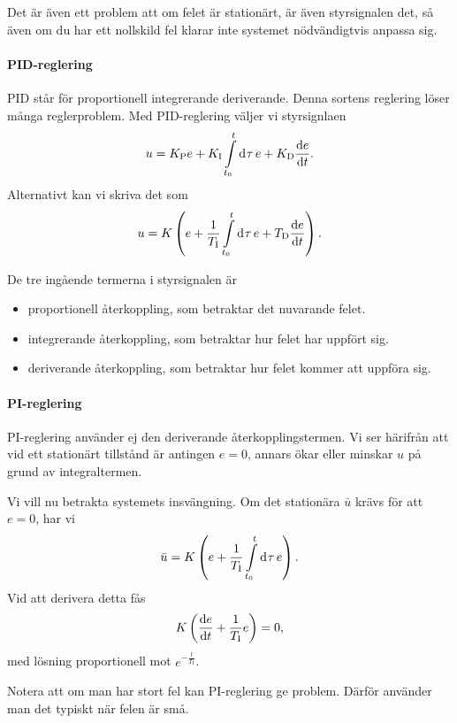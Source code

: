 Det är även ett problem att om felet är stationärt, är även styrsignalen det, så även om du har ett nollskild fel klarar inte systemet nödvändigtvis anpassa sig.

\paragraph{PID-reglering}
PID står för proportionell integrerande deriverande. Denna sortens reglering löser många reglerproblem. Med PID-reglering väljer vi styrsignlaen
\begin{align*}
	u = K_{\text{P}}e + K_{\text{I}}\int\limits_{t_{0}}^{t}\dd[]{\tau}e + K_{\text{D}}\dv{e}{t}.
\end{align*}
Alternativt kan vi skriva det som
\begin{align*}
	u = K\left(e + \frac{1}{T_{\text{I}}}\int\limits_{t_{0}}^{t}\dd[]{\tau}e + T_{\text{D}}\dv{e}{t}\right).
\end{align*}

De tre ingående termerna i styrsignalen är
\begin{itemize}
	\item proportionell återkoppling, som betraktar det nuvarande felet.
	\item integrerande återkoppling, som betraktar hur felet har uppfört sig.
	\item deriverande återkoppling, som betraktar hur felet kommer att uppföra sig.
\end{itemize}

\paragraph{PI-reglering}
PI-reglering använder ej den deriverande återkopplingstermen. Vi ser härifrån att vid ett stationärt tillstånd är antingen $e = 0$, annars ökar eller minskar $u$ på grund av integraltermen.

Vi vill nu betrakta systemets insvängning. Om det stationära $\bar{u}$ krävs för att $e = 0$, har vi
\begin{align*}
	\bar{u} = K\left(e + \frac{1}{T_{\text{I}}}\int\limits_{t_{0}}^{t}\dd[]{\tau}e\right).
\end{align*}
Vid att derivera detta fås
\begin{align*}
	K\left(\dv{e}{t} + \frac{1}{T_{\text{I}}}e\right) = 0,
\end{align*}
med lösning proportionell mot $e^{-\frac{t}{T_{\text{I}}}}$.

Notera att om man har stort fel kan PI-reglering ge problem. Därför använder man det typiskt när felen är små.

